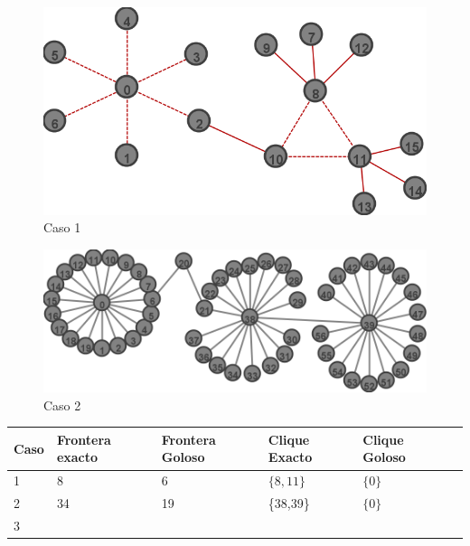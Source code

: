 \begin{figure}[H]
\centering\includegraphics[width=11 cm]{goloso/labl.png}
\caption{Caso 1}
\end{figure}

\begin{figure}[H]
\centering\includegraphics[width=12 cm]{goloso/goloso2.png}
\caption{Caso 2}
\end{figure}

\begin{center}
    \begin{tabular}{ | l | l | l | l | l | p{5cm} |}
    \hline
    Caso & Frontera exacto & Frontera Goloso & Clique Exacto & Clique Goloso \\ \hline
    1 & 8 & 6 & $\{8,11\}$ & $\{0\}$ \\ \hline
    2 & 34 & 19 &\{38,39\}& $\{0\}$ \\ \hline
    3 &  &  &  & \\
	\hline
    \end{tabular}
\end{center}
